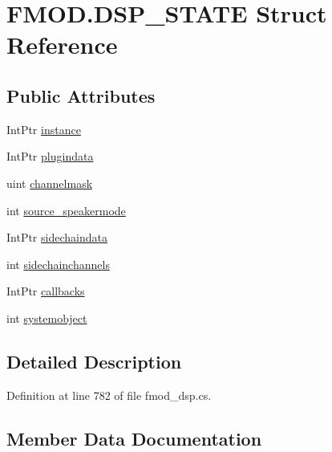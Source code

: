 \hypertarget{struct_f_m_o_d_1_1_d_s_p___s_t_a_t_e}{}\section{F\+M\+O\+D.\+D\+S\+P\+\_\+\+S\+T\+A\+TE Struct Reference}
\label{struct_f_m_o_d_1_1_d_s_p___s_t_a_t_e}
\subsection*{Public Attributes}
\begin{DoxyCompactItemize}
\item 
Int\+Ptr \hyperlink{struct_f_m_o_d_1_1_d_s_p___s_t_a_t_e_a9d09cb20a4e1923b7326cb8a60fcc728}{instance}
\item 
Int\+Ptr \hyperlink{struct_f_m_o_d_1_1_d_s_p___s_t_a_t_e_a2436ffc8084a3ebc4a4ae4361e21acc7}{plugindata}
\item 
uint \hyperlink{struct_f_m_o_d_1_1_d_s_p___s_t_a_t_e_a57c8297a3cd0e280a0bdfc5de15dfa59}{channelmask}
\item 
int \hyperlink{struct_f_m_o_d_1_1_d_s_p___s_t_a_t_e_a85f78f26d34af49ebee04d51fdc1b086}{source\+\_\+speakermode}
\item 
Int\+Ptr \hyperlink{struct_f_m_o_d_1_1_d_s_p___s_t_a_t_e_ad3c15a24d714e1cb55d46af2d8d5f40f}{sidechaindata}
\item 
int \hyperlink{struct_f_m_o_d_1_1_d_s_p___s_t_a_t_e_a3cd296e44bbced45a4eeb508552e0902}{sidechainchannels}
\item 
Int\+Ptr \hyperlink{struct_f_m_o_d_1_1_d_s_p___s_t_a_t_e_aa1729a623dbee073ec6806706d509e01}{callbacks}
\item 
int \hyperlink{struct_f_m_o_d_1_1_d_s_p___s_t_a_t_e_aee50aacad7a3c70da70092ddec594e3a}{systemobject}
\end{DoxyCompactItemize}


\subsection{Detailed Description}


Definition at line 782 of file fmod\+\_\+dsp.\+cs.



\subsection{Member Data Documentation}
\mbox{\label{struct_f_m_o_d_1_1_d_s_p___s_t_a_t_e_aa1729a623dbee073ec6806706d509e01}} 
